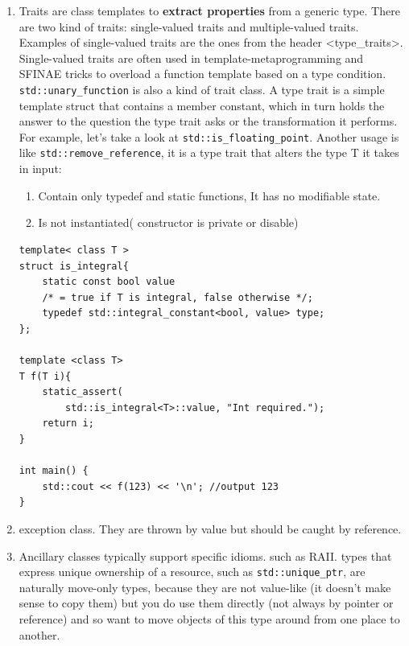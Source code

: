 \documentclass[a4paper,11pt,twoside]{book}
\begin{document}
\begin{itemize}
\begin{enumerate}
	\item Traits are class templates to \textbf{extract properties} from a generic type. There are two kind of traits: single-valued traits and multiple-valued traits. Examples of single-valued traits are the ones from the header <type\_traits>. Single-valued traits are often used in template-metaprogramming and SFINAE tricks to overload a function template based on a type condition. \texttt{std::unary\_function} is also a kind of trait class.  A type trait is a simple template struct that contains a member constant, which in turn holds the answer to the question the type trait asks or the transformation it performs. For example, let's take a look at \texttt{std::is\_floating\_point}. Another usage is like \texttt{std::remove\_reference}, it is a type trait that alters the type T it takes in input:

		\begin{enumerate}
			\item Contain only typedef and static functions, It has no modifiable state.
			\item Is not instantiated( constructor is private or disable)
		\end{enumerate}
	\begin{lstlisting}[numbers=none]
template< class T >
struct is_integral{
	static const bool value
	/* = true if T is integral, false otherwise */;
	typedef std::integral_constant<bool, value> type;
};
	
template <class T>
T f(T i){
	static_assert(
		std::is_integral<T>::value, "Int required.");
	return i;
}

int main() {
	std::cout << f(123) << '\n'; //output 123
}
\end{lstlisting}

    \item exception class. They are thrown by value but should be caught by reference. 

		\item Ancillary classes typically support specific idioms. such as RAII.  types that express unique ownership of a resource, such as \texttt{std::unique\_ptr}, are naturally move-only types, because they are not value-like (it doesn't make sense to copy them) but you do use them directly (not always by pointer or reference) and so want to move objects of this type around from one place to another.	


\end{enumerate}
\end{itemize}
\end{document}
